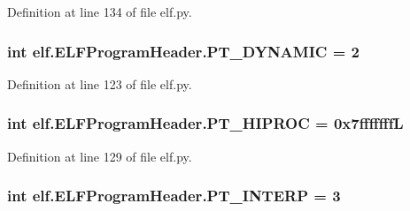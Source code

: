 Definition at line 134 of file elf.\+py.

\subsubsection[{\texorpdfstring{P\+T\+\_\+\+D\+Y\+N\+A\+M\+IC}{PT_DYNAMIC}}]{\setlength{\rightskip}{0pt plus 5cm}int elf.\+E\+L\+F\+Program\+Header.\+P\+T\+\_\+\+D\+Y\+N\+A\+M\+IC = 2\hspace{0.3cm}{\ttfamily [static]}}\hypertarget{clasself_1_1_e_l_f_program_header_a0a20c63feed45745226427faa07b048f}{}\label{clasself_1_1_e_l_f_program_header_a0a20c63feed45745226427faa07b048f}


Definition at line 123 of file elf.\+py.

\subsubsection[{\texorpdfstring{P\+T\+\_\+\+H\+I\+P\+R\+OC}{PT_HIPROC}}]{\setlength{\rightskip}{0pt plus 5cm}int elf.\+E\+L\+F\+Program\+Header.\+P\+T\+\_\+\+H\+I\+P\+R\+OC = 0x7fffffffL\hspace{0.3cm}{\ttfamily [static]}}\hypertarget{clasself_1_1_e_l_f_program_header_a6495f2be7c4036a6afc89040951d067e}{}\label{clasself_1_1_e_l_f_program_header_a6495f2be7c4036a6afc89040951d067e}


Definition at line 129 of file elf.\+py.

\subsubsection[{\texorpdfstring{P\+T\+\_\+\+I\+N\+T\+E\+RP}{PT_INTERP}}]{\setlength{\rightskip}{0pt plus 5cm}int elf.\+E\+L\+F\+Program\+Header.\+P\+T\+\_\+\+I\+N\+T\+E\+RP = 3\hspace{0.3cm}{\ttfamily [static]}}\hypertarget{clasself_1_1_e_l_f_program_header_a8b75255d767916a089e666da9e9c76f9}{}\label{clasself_1_1_e_l_f_program_header_a8b75255d767916a089e666da9e9c76f9}


